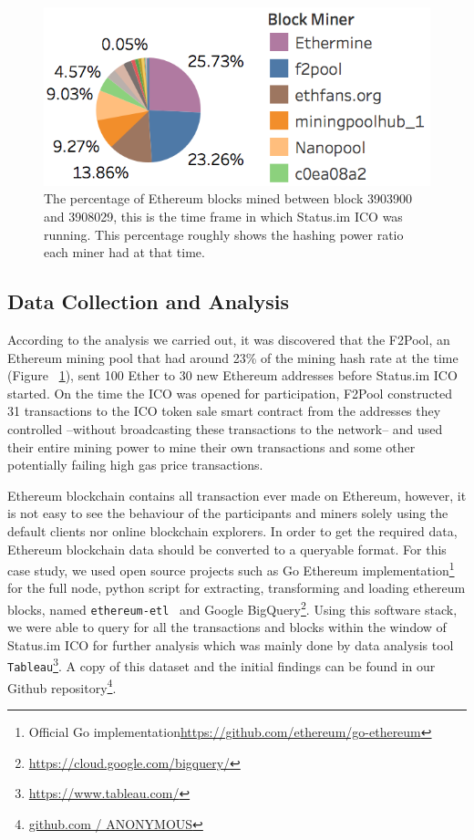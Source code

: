 \begin{figure}[h]
\centering
\includegraphics[width=0.5\linewidth]{figures/Mining_pool_ratio.png}
\caption{The percentage of Ethereum blocks mined between block 3903900 and 3908029, this is the time frame in which Status.im ICO was running. This percentage roughly shows the hashing power ratio each miner had at that time. \label{fig:mining_pool_ratio}} %
\end{figure}

\subsection{Data Collection and Analysis}
According to the analysis we carried out, it was discovered that the F2Pool, an Ethereum mining pool that had around 23\% of the mining hash rate at the time (Figure ~\ref{fig:mining_pool_ratio}), sent 100 Ether to 30 new Ethereum addresses before Status.im ICO started. On the time the ICO was opened for participation, F2Pool constructed 31 transactions to the ICO token sale smart contract from the addresses they controlled --without broadcasting these transactions to the network-- and used their entire mining power to mine their own transactions and some other potentially failing high gas price transactions.

Ethereum blockchain contains all transaction ever made on Ethereum, however, it is not easy to see the behaviour of the participants and miners solely using the default clients nor online blockchain explorers. In order to get the required data, Ethereum blockchain data should be converted to a queryable format. For this case study, we used open source projects such as Go Ethereum implementation\footnote{Official Go implementation\url{https://github.com/ethereum/go-ethereum}} for the full node, python script for extracting, transforming and loading ethereum blocks, named \texttt{ethereum-etl}~\cite{ethereumetl} and Google BigQuery\footnote{\url{https://cloud.google.com/bigquery/}}. Using this software stack, we were able to query for all the transactions and blocks within the window of Status.im ICO for further analysis which was mainly done by data analysis tool \texttt{Tableau}\footnote{\url{https://www.tableau.com/}}. A copy of this dataset and the initial findings can be found in our Github repository\footnote{\url{github.com / ANONYMOUS}}. 

